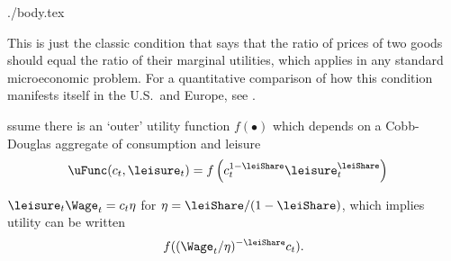 \documentclass{handout}
\begin{document}
\begin{verbatimwrite}{./body.tex}
{This is just the classic condition that says that the 
ratio of prices of two goods should equal the ratio of their
marginal utilities, which applies in any standard microeconomic
problem.  For a quantitative comparison of how this condition manifests
itself in the U.S.\ and Europe, see \cite{zwiebelLeisure}.

}{}


ssume there is an `outer' utility function ${f}(\bullet)$ which
depends on a Cobb-Douglas aggregate of consumption and leisure
\begin{equation}\begin{gathered}\begin{aligned}
  \uFunc(c_{t},\leisure_{t}) & =  {f}\left(c_{t}^{1-\leiShare}\leisure_{t}^{\leiShare}\right)
\end{aligned}\end{gathered}\end{equation}

$\leisure_{t} \Wage_{t} = c_{t} \eta $ for $\eta=\leiShare/(1-\leiShare)$, which implies utility can be written
\begin{equation}\begin{gathered}\begin{aligned}
  {f}((\Wage_{t}/\eta)^{-\leiShare}c_{t} ).
\end{aligned}\end{gathered}\end{equation}



\end{verbatimwrite}
\end{document}

